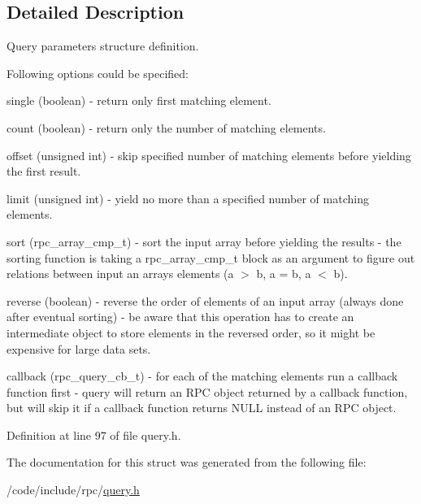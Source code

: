 \subsection{Detailed Description}
Query parameters structure definition.

Following options could be specified\+:
\begin{DoxyItemize}
\item single (boolean) -\/ return only first matching element.
\item count (boolean) -\/ return only the number of matching elements.
\item offset (unsigned int) -\/ skip specified number of matching elements before yielding the first result.
\item limit (unsigned int) -\/ yield no more than a specified number of matching elements.
\item sort (rpc\+\_\+array\+\_\+cmp\+\_\+t) -\/ sort the input array before yielding the results -\/ the sorting function is taking a rpc\+\_\+array\+\_\+cmp\+\_\+t block as an argument to figure out relations between input an array\textquotesingle{}s elements (a $>$ b, a = b, a $<$ b).
\item reverse (boolean) -\/ reverse the order of elements of an input array (always done after eventual sorting) -\/ be aware that this operation has to create an intermediate object to store elements in the reversed order, so it might be expensive for large data sets.
\item callback (rpc\+\_\+query\+\_\+cb\+\_\+t) -\/ for each of the matching elements run a callback function first -\/ query will return an R\+PC object returned by a callback function, but will skip it if a callback function returns N\+U\+LL instead of an R\+PC object. 
\end{DoxyItemize}

Definition at line 97 of file query.\+h.



The documentation for this struct was generated from the following file\+:\begin{DoxyCompactItemize}
\item 
/code/include/rpc/\hyperlink{query_8h}{query.\+h}\end{DoxyCompactItemize}
